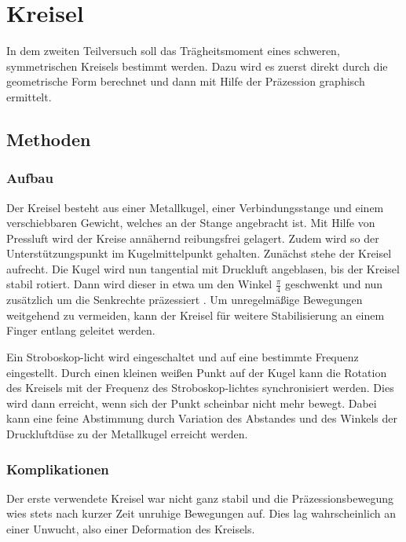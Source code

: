 \section{Kreisel} %

In dem zweiten Teilversuch  soll das Trägheitsmoment eines schweren, symmetrischen Kreisels bestimmt werden.
Dazu wird es zuerst direkt durch die geometrische Form berechnet und dann mit Hilfe der Präzession graphisch ermittelt.

\subsection{Methoden}

	\subsubsection{Aufbau}
	
	Der Kreisel besteht aus einer Metallkugel, einer Verbindungsstange und einem verschiebbaren Gewicht, welches an der Stange angebracht ist.
	Mit Hilfe von Pressluft wird der Kreise annähernd reibungsfrei gelagert.
	Zudem wird so der Unterstützungspunkt im Kugelmittelpunkt gehalten.
	Zunächst stehe der Kreisel aufrecht.
	Die Kugel wird nun tangential mit Druckluft angeblasen, bis der Kreisel stabil rotiert.
	Dann wird dieser in etwa um den Winkel $\frac{\pi}{4}$ geschwenkt und nun zusätzlich um die Senkrechte präzessiert .
	Um unregelmäßige Bewegungen weitgehend zu vermeiden, kann der Kreisel für weitere Stabilisierung an einem Finger entlang geleitet werden.
	
	Ein Stroboskop-licht wird eingeschaltet und auf eine bestimmte Frequenz eingestellt.
	Durch einen kleinen weißen Punkt auf der Kugel kann die Rotation des Kreisels mit der Frequenz des Stroboskop-lichtes synchronisiert werden.
	Dies wird dann erreicht, wenn sich der Punkt scheinbar nicht mehr bewegt.
	Dabei kann eine feine Abstimmung durch Variation des Abstandes und des Winkels der Druckluftdüse zu der Metallkugel erreicht werden.
	
	\subsubsection{Komplikationen}
	
	Der erste verwendete Kreisel war nicht ganz stabil und die Präzessionsbewegung wies stets nach kurzer Zeit unruhige Bewegungen auf.
	Dies lag wahrscheinlich an einer Unwucht, also einer Deformation des Kreisels.
	
